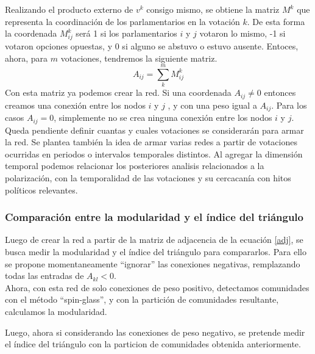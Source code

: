 \documentclass{proyectotesis}
\begin{document}
Realizando el producto externo de $v^k$ consigo mismo, se obtiene la matriz $M^k$ que representa la coordinación de los parlamentarios en la votación $k$. De esta forma la coordenada $M^k_{ij}$ será 1 si los parlamentarios $i$ y $j$ votaron lo mismo, -1 si votaron opciones opuestas, y 0 si alguno se abstuvo o estuvo ausente. Entoces, ahora, para $m$ votaciones, tendremos la siguiente matriz.
\begin{equation}
    A_{ij} = \sum_k^m M^k_{ij} \label{adj}
\end{equation}
Con esta matriz ya podemos crear la red. Si una coordenada $A_{ij}\neq 0$ entonces creamos una conexión entre los nodos $i$ y $j$ , y con una peso igual a $A_{ij}$. Para los casos $A_{ij} = 0$, simplemente no se crea ninguna conexión entre los nodos $i$ y $j$.\\

Queda pendiente definir cuantas y cuales votaciones se considerarán para armar la red. Se plantea también la idea de armar varias redes a partir de votaciones ocurridas en periodos o intervalos temporales distintos. Al agregar la dimensión temporal podemos relacionar los posteriores analisis relacionados a la polarización, con la temporalidad de las votaciones y su cercacanía con hitos políticos relevantes.

\subsubsection{Comparación entre la modularidad y el índice del triángulo} 
Luego de crear la red a partir de la matriz de adjacencia de la ecuación \eqref{adj}, se busca medir la modularidad y el índice del triángulo para compararlos. Para ello se propone momentaneamente ``ignorar'' las conexiones negativas, remplazando todas las entradas de $A_{kl} < 0$.\\ 

Ahora, con esta red de solo conexiones de peso positivo, detectamos comunidades con el método ``spin-glass'', y con la partición de comunidades resultante, calculamos la modularidad. 

Luego, ahora si considerando las conexiones de peso negativo, se pretende medir el índice del triángulo con la particion de comunidades obtenida anteriormente.
\end{document}
